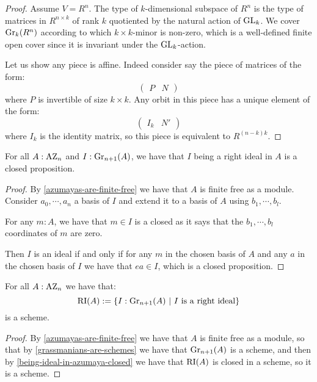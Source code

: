\begin{proof}
Assume $V=R^n$. The type of $k$-dimensional subspace of $R^n$ is the type of matrices in $R^{n\times k}$ of rank $k$ quotiented by the natural action of $\operatorname{GL}_k$. We cover $\mathrm{Gr}_k(R^n)$ according to which $k\times k$-minor is non-zero, which is a well-defined finite open cover since it is invariant under the $\operatorname{GL}_k$-action. 

Let us show any piece is affine. Indeed consider say the piece of matrices of the form:
\[\begin{pmatrix}
P & N
\end{pmatrix}\]
where $P$ is invertible of size $k\times k$. Any orbit in this piece has a unique element of the form:
\[\begin{pmatrix}
I_k & N'
\end{pmatrix}\]
where $I_k$ is the identity matrix, so this piece is equivalent to $R^{(n-k)k}$.
\end{proof}

\begin{lemma}\label{being-ideal-in-azumaya-closed}
For all $A:\mathrm{AZ}_n$ and $I:\mathrm{Gr}_{n+1}(A)$, we have that $I$ being a right ideal in $A$ is a closed proposition.
\end{lemma}

\begin{proof}
By \cref{azumayas-are-finite-free} we have that $A$ is finite free as a module. Consider $a_0,\cdots,a_n$ a basis of $I$ and extend it to a basis of $A$ using $b_1,\cdots,b_l$. 

For any $m:A$, we have that $m\in I$ is a closed as it says that the $b_1,\cdots,b_l$ coordinates of $m$ are zero. 

Then $I$ is an ideal if and only if for any $m$ in the chosen basis of $A$ and any $a$ in the chosen basis of $I$ we have that $ea\in I$, which is a closed proposition.
\end{proof}

\begin{lemma}\label{severi-brauer-are-schemes}
For all $A:\mathrm{AZ}_n$ we have that:
\[\RI(A) := \{I:\Gr_{n+1}(A)\ |\ I\ \mathrm{is\ a\ right\ ideal}\}\]
is a scheme.
\end{lemma}

\begin{proof}
By \cref{azumayas-are-finite-free} we have that $A$ is finite free as a module, so that by \cref{grassmanians-are-schemes} we have that $\mathrm{Gr}_{n+1}(A)$ is a scheme, and then by \cref{being-ideal-in-azumaya-closed} we have that $\mathrm{RI}(A)$ is closed in a scheme, so it is a scheme.
\end{proof}


